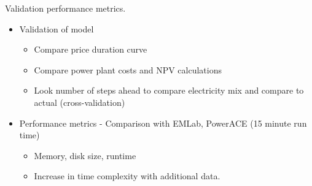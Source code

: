 \begin{table}[h]
	\centering
	\caption{Validation performance metrics.}
	\label{table:validation_metrics}
\end{table}



\begin{itemize}
	\item Validation of model 
	\begin{itemize}
		\item Compare price duration curve
		\item Compare power plant costs and NPV calculations
		\item Look number of steps ahead to compare electricity mix and compare to actual (cross-validation)
	\end{itemize} 
	\item Performance metrics - Comparison with EMLab, PowerACE (15 minute run time)
	\begin{itemize}
		\item Memory, disk size, runtime
		\item Increase in time complexity with additional data.
	\end{itemize}
\end{itemize}
